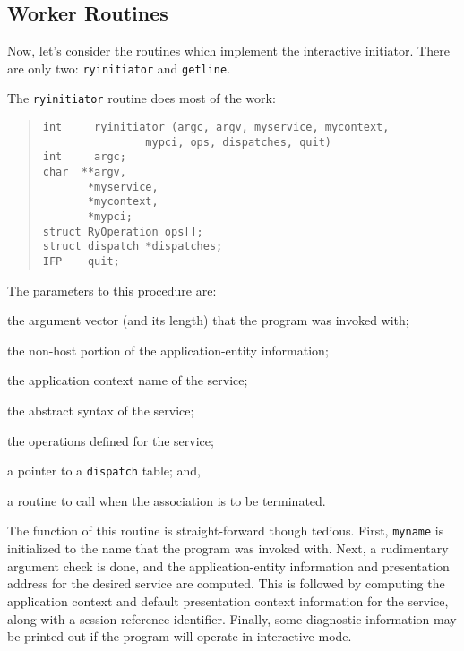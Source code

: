 \newpage

\subsection	{Worker Routines}
Now, let's consider the routines which implement the interactive initiator.
There are only two: \verb"ryinitiator" and \verb"getline".

The \verb"ryinitiator" routine does most of the work:
\begin{quote}\small\begin{verbatim}
int     ryinitiator (argc, argv, myservice, mycontext,
                mypci, ops, dispatches, quit)
int     argc;
char  **argv,
       *myservice,
       *mycontext,
       *mypci;
struct RyOperation ops[];
struct dispatch *dispatches;
IFP    quit;
\end{verbatim}\end{quote}
The parameters to this procedure are:
\begin{describe}
\item[\verb"argc"/\verb"argv":] the argument vector (and its length)
that the program was invoked with;

\item[\verb"myservice":] the non-host portion of the application-entity
information;

\item[\verb"mycontext":] the application context name of the service;

\item[\verb"mypci":] the abstract syntax of the service;

\item[\verb"ops":] the operations defined for the service;

\item[\verb"dispatches":] a pointer to a \verb"dispatch" table;
and,

\item[\verb"quit":] a routine to call when the association is to be
terminated.
\end{describe}
The function of this routine is straight-forward though tedious.
First, \verb"myname" is initialized to the name that the program was invoked
with.
Next, a rudimentary argument check is done,
and the application-entity information and presentation address for the desired
service are computed.
This is followed by computing the application context and default
presentation context information for the service,
along with a session reference identifier.
Finally, some diagnostic information may be printed out if the program will
operate in interactive mode.

